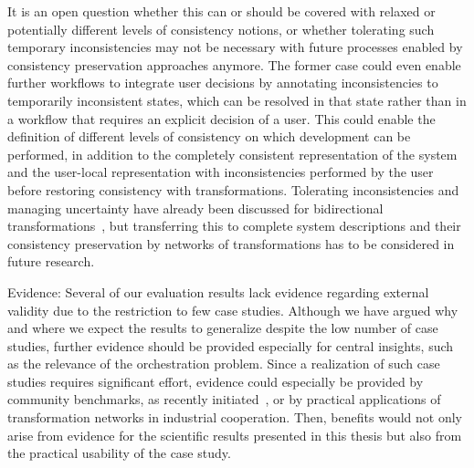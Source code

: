 \begin{properdescription}
It is an open question whether this can or should be covered with relaxed or potentially different levels of consistency notions, or whether tolerating such temporary inconsistencies may not be necessary with future processes enabled by consistency preservation approaches anymore.
The former case could even enable further workflows to integrate user decisions by annotating inconsistencies to temporarily inconsistent states, which can be resolved in that state rather than in a workflow that requires an explicit decision of a user.
This could enable the definition of different levels of consistency on which development can be performed, in addition to the completely consistent representation of the system and the user-local representation with inconsistencies performed by the user before restoring consistency with transformations.
Tolerating inconsistencies and managing uncertainty have already been discussed for bidirectional transformations~\cite{eramo2015uncertainty-SLE,stevens2014Partial-FASE,diskin2016UncertaintyBidirectionalTransformations-BX}, but transferring this to complete system descriptions and their consistency preservation by networks of transformations has to be considered in future research.
\item[Evidence:]
Several of our evaluation results lack evidence regarding external validity due to the restriction to few case studies.
Although we have argued why and where we expect the results to generalize despite the low number of case studies, further evidence should be provided especially for central insights, such as the relevance of the orchestration problem.
Since a realization of such case studies requires significant effort, evidence could especially be provided by community benchmarks, as recently initiated~\cite{anjorin2019bxBenchmark-SoSym}, or by practical applications of transformation networks in industrial cooperation.
Then, benefits would not only arise from evidence for the scientific results presented in this thesis but also from the practical usability of the case study.
\end{properdescription}
